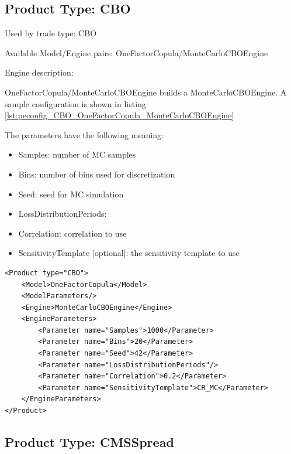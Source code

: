 \subsection{Product Type: CBO}

Used by trade type: CBO

Available Model/Engine pairs: OneFactorCopula/MonteCarloCBOEngine

Engine description:

OneFactorCopula/MonteCarloCBOEngine builds a MonteCarloCBOEngine. A sample configuration is shown in listing
\ref{lst:peconfig_CBO_OneFactorCopula_MonteCarloCBOEngine}

The parameters have the following meaning:

\begin{itemize}
\item Samples: number of MC samples
\item Bins: number of bins used for discretization
\item Seed: seed for MC simulation
\item LossDistributionPeriods:
\item Correlation: correlation to use
\item SensitivityTemplate [optional]: the sensitivity template to use
\end{itemize}

\begin{longlisting}
\begin{verbatim}
<Product type="CBO">
    <Model>OneFactorCopula</Model>
    <ModelParameters/>
    <Engine>MonteCarloCBOEngine</Engine>
    <EngineParameters>
        <Parameter name="Samples">1000</Parameter>
        <Parameter name="Bins">20</Parameter>
        <Parameter name="Seed">42</Parameter>
        <Parameter name="LossDistributionPeriods"/>
        <Parameter name="Correlation">0.2</Parameter>
        <Parameter name="SensitivityTemplate">CR_MC</Parameter>
    </EngineParameters>
</Product>
\end{verbatim}
\caption{Configuration for Product CBO, Model OneFactorCopula, Engine MonteCarloCBOEngine}
\label{lst:peconfig_CBO_OneFactorCopula_MonteCarloCBOEngine}
\end{longlisting}

\subsection{Product Type: CMSSpread}

